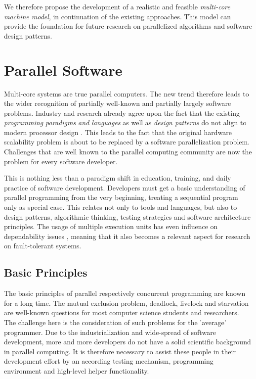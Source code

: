 \documentclass[a4paper]{article}
\begin{document}
We therefore propose the development of a realistic and feasible \emph{multi-core machine model}, in continuation of the existing approaches. This model can provide the foundation for future research on parallelized algorithms and software design patterns.

\section{Parallel Software}

Multi-core systems are true parallel computers. The new trend therefore leads to the wider recognition of partially well-known and partially largely software problems. Industry and research already agree upon the fact that the existing \emph{programming paradigms and languages} as well as \emph{design patterns} do not align to modern processor design \cite{amdahlacm}.  This leads to the fact that the original hardware scalability problem is about to be replaced by a software parallelization problem. Challenges that are well known to the parallel computing community are now the problem for every software developer. 

This is nothing less than a paradigm shift in education, training, and daily practice of software development. Developers must get a basic understanding of parallel programming from the very beginning, treating a sequential program only as special case. This relates not only to tools and languages, but also to design patterns, algorithmic thinking, testing strategies and software architecture principles. The usage of multiple execution units has even influence on dependability issues \cite{mcoreisolation}, meaning that it also becomes a relevant aspect for research on fault-tolerant systems. 

\subsection*{Basic Principles}

The basic principles of parallel respectively concurrent programming are known for a long time. The mutual exclusion problem, deadlock, livelock and starvation are well-known questions for most computer science students and researchers. The challenge here is the consideration of such problems for the 'average' programmer. Due to the industrialization and wide-spread of software development, more and more developers do not have a solid scientific background in parallel computing. It is therefore necessary to assist these people in their development effort by an according testing mechanism, programming environment and high-level helper functionality. 
\end{document}
